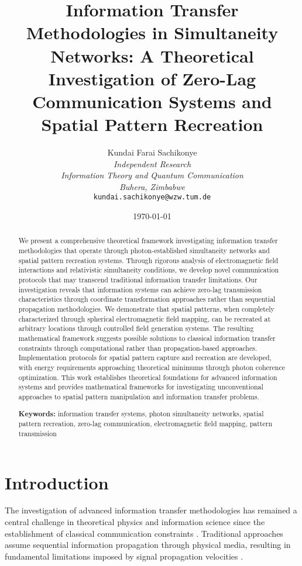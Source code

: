\documentclass[12pt,a4paper]{article}
\title{\textbf{Information Transfer Methodologies in Simultaneity Networks: A Theoretical Investigation of Zero-Lag Communication Systems and Spatial Pattern Recreation}}
\author{
Kundai Farai Sachikonye\\
\textit{Independent Research}\\
\textit{Information Theory and Quantum Communication}\\
\textit{Buhera, Zimbabwe}\\
\texttt{kundai.sachikonye@wzw.tum.de}
}
\date{\today}
\begin{document}
\maketitle

\begin{abstract}
We present a comprehensive theoretical framework investigating information transfer methodologies that operate through photon-established simultaneity networks and spatial pattern recreation systems. Through rigorous analysis of electromagnetic field interactions and relativistic simultaneity conditions, we develop novel communication protocols that may transcend traditional information transfer limitations. Our investigation reveals that information systems can achieve zero-lag transmission characteristics through coordinate transformation approaches rather than sequential propagation methodologies. We demonstrate that spatial patterns, when completely characterized through spherical electromagnetic field mapping, can be recreated at arbitrary locations through controlled field generation systems. The resulting mathematical framework suggests possible solutions to classical information transfer constraints through computational rather than propagation-based approaches. Implementation protocols for spatial pattern capture and recreation are developed, with energy requirements approaching theoretical minimums through photon coherence optimization. This work establishes theoretical foundations for advanced information systems and provides mathematical frameworks for investigating unconventional approaches to spatial pattern manipulation and information transfer problems.

\textbf{Keywords:} information transfer systems, photon simultaneity networks, spatial pattern recreation, zero-lag communication, electromagnetic field mapping, pattern transmission
\end{abstract}

\section{Introduction}

The investigation of advanced information transfer methodologies has remained a central challenge in theoretical physics and information science since the establishment of classical communication constraints \cite{shannon1948mathematical}. Traditional approaches assume sequential information propagation through physical media, resulting in fundamental limitations imposed by signal propagation velocities \cite{cover2006elements}.
\end{document}
